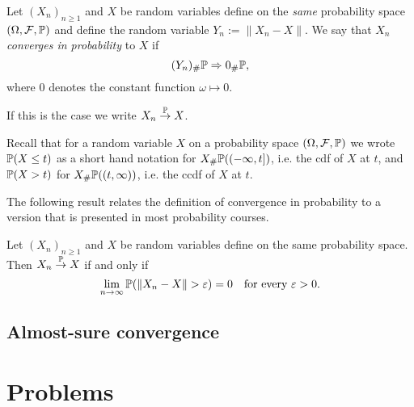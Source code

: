 \begin{definition}
Let $(X_n)_{n \ge 1}$ and $X$ be random variables define on the \emph{same} probability space $(\Omega, \mathcal F, \mathbb P)$ and define the random variable $Y_n := \|X_n - X\|$. We say that $X_n$ \emph{converges in probability} to $X$ if
\[
	(Y_n)_\# \mathbb P \Rightarrow 0_\# \mathbb P,
\] 
where $0$ denotes the constant function $\omega \mapsto 0$.

If this is the case we write $X_n \stackrel{\mathbb P}{\rightarrow} X$.
\end{definition}

Recall that for a random variable $X$ on a probability space $(\Omega, \mathcal F, \mathbb P)$ we wrote $\mathbb P(X \le t)$ as a short hand notation for $X_\# \mathbb P ((-\infty,t])$, i.e. the cdf of $X$ at $t$, and $\mathbb P(X > t)$ for $X_\# \mathbb P ((t,\infty))$, i.e. the ccdf of $X$ at $t$.

The following result relates the definition of convergence in probability to a version that is presented in most probability courses.

\begin{lemma}\label{lem:convergence_probability_classical}
Let $(X_n)_{n \ge 1}$ and $X$ be random variables define on the same probability space. Then $X_n \stackrel{\mathbb P}{\rightarrow} X$ if and only if
\[
	\lim_{n \to \infty} \mathbb P(\|X_n - X\| > \varepsilon) = 0 \quad \text{for every } \varepsilon > 0.
\]
\end{lemma}

\subsection{Almost-sure convergence}

\section{Problems}

